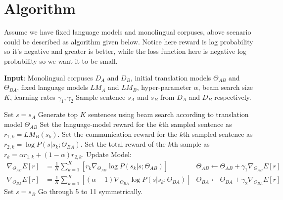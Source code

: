 \documentclass[11pt]{article}
\begin{document}
{\part{Algorithm}
Assume we have fixed language models and monolingual corpuses, above scenario could be described as algorithm given below. Notice here reward is log probability so it's negative and greater is better, while the loss function here is negative log probability so we want it to be small.
\begin{algorithm}
\begin{algorithmic}[1]
\State \textbf{Input}: Monolingual corpuses $D_A$ and $D_B$, initial translation models $\Theta_{AB}$ and $\Theta_{BA}$, fixed language models $LM_A$ and $LM_B$, hyper-parameter $\alpha$, beam search size $K$, learning rates $\gamma_1,\gamma_2$
\Repeat
\State Sample sentence $s_A$ and $s_B$ from $D_A$ and $ D_B$ respectively.

\State Set $s = s_A$
\State Generate top $K$ sentences using beam search according to translation model $\Theta_{AB}$
\State Set the language-model reward for the $k$th sampled sentence as $r_{1,k}=LM_B(s_{k})$.
\State Set the communication reward for the $k$th sampled sentence as $r_{2,k}=\log P(s|s_{k};\Theta_{BA})$.
\State Set the total reward of the $k$th sample as $r_k = \alpha r_{1,k} + (1-\alpha)r_{2,k}$.
\EndFor
\State Update Model:
\begin{align*}
\nabla_{\Theta_{AB}} E[r] &= \frac{1}{K}\sum^K_{k=1}[r_k\nabla_{\Theta_{AB}}\log P(s_{k}|s; \Theta_{AB})]&\Theta_{AB} \leftarrow\Theta_{AB} + \gamma_1\nabla_{\Theta_{AB}} E[r]\\
\nabla_{\Theta_{BA}} E[r] &= \frac{1}{K}\sum^K_{k=1} [(\alpha - 1)\nabla_{\Theta_{BA}} \log P(s|s_{k};\Theta_{BA})]&\Theta_{BA} \leftarrow\Theta_{BA} + \gamma_2\nabla_{\Theta_{BA}} E[r]
\end{align*}
\State Set $s = s_B$
\State Go through 5 to 11 symmetrically.
\end{algorithmic}
\end{algorithm}

}
\end{document}
